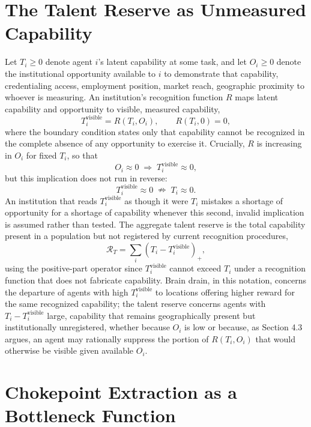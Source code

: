 \documentclass[11pt]{article}
\begin{document}
\section{The Talent Reserve as Unmeasured Capability}

Let $T_i \geq 0$ denote agent $i$'s latent capability at some task, and let $O_i \geq 0$ denote the institutional opportunity available to $i$ to demonstrate that capability, credentialing access, employment position, market reach, geographic proximity to whoever is measuring. An institution's recognition function $R$ maps latent capability and opportunity to visible, measured capability,
\[
T_i^{\text{visible}} = R(T_i, O_i), \qquad R(T_i, 0) = 0,
\]
where the boundary condition states only that capability cannot be recognized in the complete absence of any opportunity to exercise it. Crucially, $R$ is increasing in $O_i$ for fixed $T_i$, so that
\[
O_i \approx 0 \;\Longrightarrow\; T_i^{\text{visible}} \approx 0,
\]
but this implication does not run in reverse:
\[
T_i^{\text{visible}} \approx 0 \;\nRightarrow\; T_i \approx 0.
\]
An institution that reads $T_i^{\text{visible}}$ as though it were $T_i$ mistakes a shortage of opportunity for a shortage of capability whenever this second, invalid implication is assumed rather than tested. The aggregate talent reserve is the total capability present in a population but not registered by current recognition procedures,
\[
\mathcal{R}_T = \sum_i \left( T_i - T_i^{\text{visible}} \right)_{+},
\]
using the positive-part operator since $T_i^{\text{visible}}$ cannot exceed $T_i$ under a recognition function that does not fabricate capability. Brain drain, in this notation, concerns the departure of agents with high $T_i^{\text{visible}}$ to locations offering higher reward for the same recognized capability; the talent reserve concerns agents with $T_i - T_i^{\text{visible}}$ large, capability that remains geographically present but institutionally unregistered, whether because $O_i$ is low or because, as Section 4.3 argues, an agent may rationally suppress the portion of $R(T_i, O_i)$ that would otherwise be visible given available $O_i$.

\section{Chokepoint Extraction as a Bottleneck Function}
\end{document}
